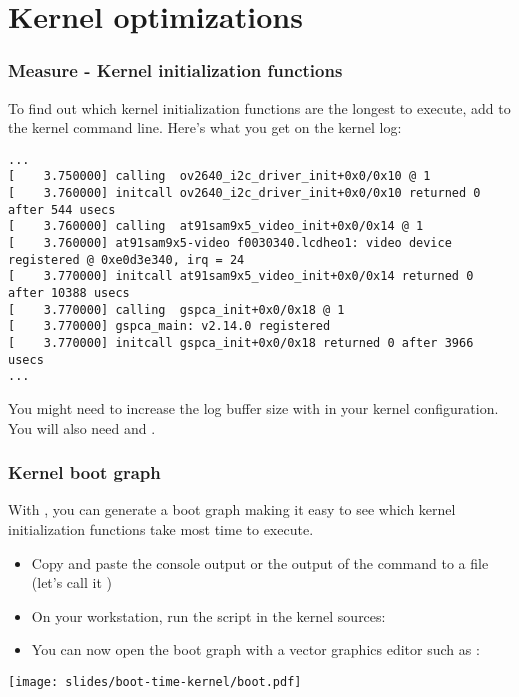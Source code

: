 \section{Kernel optimizations}

\begin{frame}[fragile]
\frametitle{Measure - Kernel initialization functions}
To find out which kernel initialization functions are the longest to
execute, add  to the kernel command line.
Here's what you get on the kernel log:
\begin{block}{}
\tiny
\begin{verbatim}
...
[    3.750000] calling  ov2640_i2c_driver_init+0x0/0x10 @ 1
[    3.760000] initcall ov2640_i2c_driver_init+0x0/0x10 returned 0 after 544 usecs
[    3.760000] calling  at91sam9x5_video_init+0x0/0x14 @ 1
[    3.760000] at91sam9x5-video f0030340.lcdheo1: video device registered @ 0xe0d3e340, irq = 24
[    3.770000] initcall at91sam9x5_video_init+0x0/0x14 returned 0 after 10388 usecs
[    3.770000] calling  gspca_init+0x0/0x18 @ 1
[    3.770000] gspca_main: v2.14.0 registered
[    3.770000] initcall gspca_init+0x0/0x18 returned 0 after 3966 usecs
...
\end{verbatim}
\end{block}
You might need to increase the log buffer size with
 in your kernel configuration. You will
also need  and .
\end{frame}

\begin{frame}
\frametitle{Kernel boot graph}
With , you can generate a boot graph
making it easy to see which kernel initialization functions
take most time to execute.
\begin{itemize}
\item Copy and paste the console output or the output of
      the  command to a file (let's call it )
\item On your workstation, run the  script
      in the kernel sources: \\
\item You can now open the boot graph with a vector graphics
      editor such as :
\end{itemize}
\begin{center}
    \texttt{[image: slides/boot-time-kernel/boot.pdf]}
\end{center}
\end{frame}

